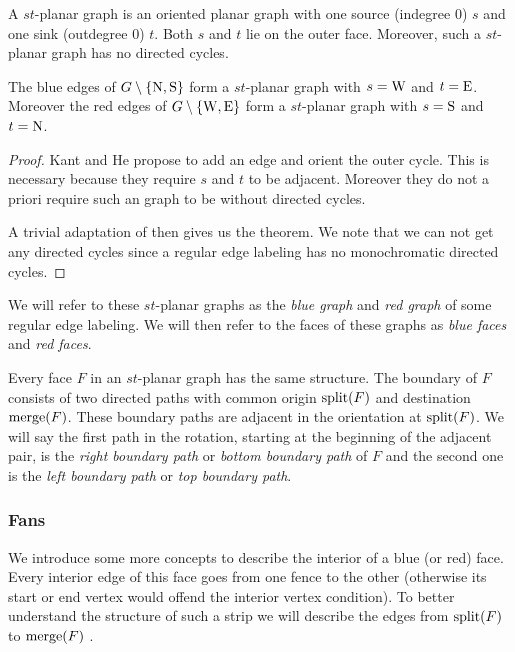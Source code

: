    A $st$-planar graph is an oriented planar graph with one source (indegree 0) $s$ and one sink (outdegree 0) $t$. Both $s$ and $t$ lie on the outer face. Moreover, such a $st$-planar graph has no directed cycles.

    \begin{thrm}
      \label{th:rel:stPlanarGraphs}
      The blue edges of $G\setminus \left\lbrace {\mathrm{N},\mathrm{S}} \right\rbrace$ form a $st$-planar graph with $s= \mathrm{W}$ and $t=\mathrm{E}$. Moreover the red edges of $G\setminus \left\lbrace {\mathrm{W},\mathrm{E}} \right\rbrace$ form a $st$-planar graph with $s= \mathrm{S}$ and $t= \mathrm{N}$.
    \end{thrm}
    \begin{proof}
      Kant and He propose to add an edge and orient the outer cycle. This is necessary because they require $s$ and $t$ to be adjacent. Moreover they do not a priori require such an graph to be without directed cycles.

      A trivial adaptation of \cite[pp.179]{Kant1997} then gives us the theorem. We note that we can not get any directed cycles since a regular edge labeling has no monochromatic directed cycles.
    \end{proof}

    We will refer to these $st$-planar graphs as the \emph{blue graph} and \emph{red graph} of some regular edge labeling. We will then refer to the faces of these graphs as \emph{blue faces} and \emph{red faces}.

    Every face $F$ in an $st$-planar graph has the same structure. The boundary of $F$ consists of two directed paths with common origin $\operatorname{split}(F)$ and  destination $\operatorname{merge}(F)$.
    These boundary paths are adjacent in the orientation at $\operatorname{split}(F)$. We will say the first path in the rotation, starting at the beginning of the adjacent pair, is the \emph{right boundary path} or \emph{bottom boundary path} of $F$ and the second one is the \emph{left boundary path} or \emph{top boundary path}.

    \subsubsection{Fans}
    We introduce some more concepts to describe the interior of a blue (or red) face. Every interior edge of this face goes from one fence to the other (otherwise its start or end vertex would offend the interior vertex condition). To better understand the structure of such a strip we will describe the edges from $\operatorname{split}(F)$ to $\operatorname{merge}(F)$ .

